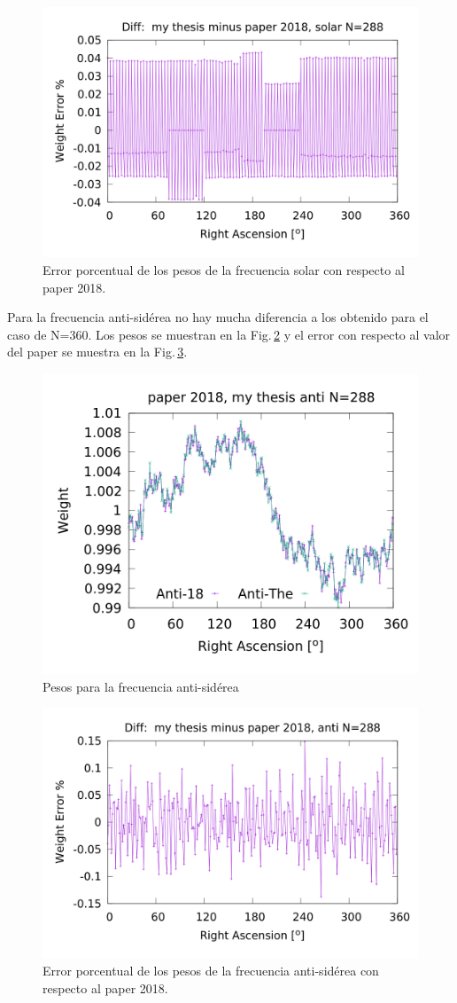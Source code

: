	\begin{figure}[H]
	\centering
	\includegraphics[width=0.8\linewidth]{Graficos/solar_my_and_paper_in_288_error.png}
	\caption{Error porcentual de los pesos de la frecuencia solar con respecto al paper 2018.}
	\label{fig:error_288_solar}
	\end{figure}

	Para la frecuencia anti-sidérea no hay mucha diferencia a los obtenido para el caso de N=360. Los pesos se muestran en la Fig.\,\ref{fig:anti_288} y el error con respecto al valor del paper se muestra en la Fig.\,\ref{fig:error_288_anti}.

	\begin{figure}[H]
	\centering
	\includegraphics[width=0.8\linewidth]{Graficos/anti_my_and_paper_2018_in_288.png}
	\caption{Pesos para la frecuencia anti-sidérea}
	\label{fig:anti_288}
	\end{figure}


	\begin{figure}[H]
	\centering
	\includegraphics[width=0.8\linewidth]{Graficos/anti_my_and_paper_in_288_error.png}
	\caption{Error porcentual de los pesos de la frecuencia anti-sidérea con respecto al paper 2018.}
	\label{fig:error_288_anti}
	\end{figure}
